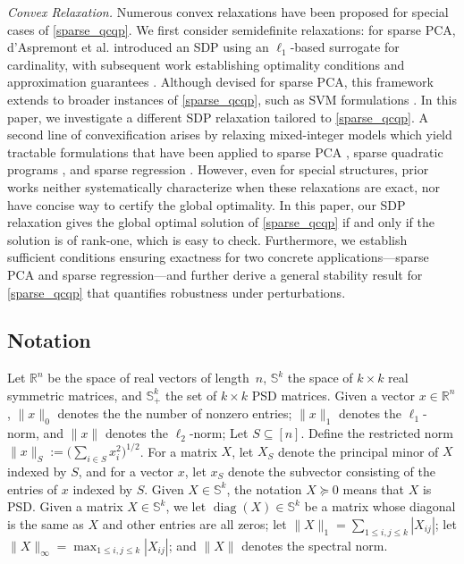 \documentclass[11pt]{amsart}
\theoremstyle{plain}
\theoremstyle{definition}
\theoremstyle{remark}
\newcommand{\RR}{\mathbb{R}}
\DeclareMathOperator{\diag}{diag}
\begin{document}
	\textit{Convex Relaxation.}
	Numerous convex relaxations have been proposed for special cases of \eqref{sparse_qcqp}. We first consider semidefinite relaxations: for sparse PCA, d’Aspremont et al. \cite{d2004direct} introduced an SDP using an $\ell_1$-based surrogate for cardinality, with subsequent work establishing optimality conditions and approximation guarantees \cite{d2008optimal,d2014approximation}. Although devised for sparse PCA, this framework extends to broader instances of \eqref{sparse_qcqp}, such as SVM formulations \cite{chan2007direct}. In this paper, we investigate a different SDP relaxation tailored to \eqref{sparse_qcqp}. A second line of convexification arises by relaxing mixed-integer models which yield tractable formulations that have been applied to sparse PCA \cite{dey2022using,li2025exact,bertsimas2022solving}, sparse quadratic programs \cite{zheng2014improving}, and sparse regression \cite{bertsimas2020sparse,bertsimas2021sparse,atamturk2025rank}. However, even for special structures, prior works neither systematically characterize when these relaxations are exact, nor have concise way to certify the global optimality. In this paper, our SDP relaxation gives the global optimal solution of \eqref{sparse_qcqp} if and only if the solution is of rank-one, which is easy to check. Furthermore, we establish sufficient conditions ensuring exactness for two concrete applications—sparse PCA and sparse regression—and further derive a general stability result for \eqref{sparse_qcqp} that quantifies robustness under perturbations.
	
	\subsection*{Notation}
	Let $\RR^n$ be the space of real vectors of length~$n$, $\mathbb{S}^k$ the space of $k \times k$ real symmetric matrices, and $\mathbb{S}^k_+$ the set of $k \times k$ PSD matrices.  Given a vector $x\in\RR^n$, $\|x\|_0$ denotes the the number of nonzero entries; $\|x\|_1$ denotes the $\ell_1$-norm, and $\|x\|$ denotes the $\ell_2$-norm; Let \(S \subseteq [n]\). Define the restricted norm \(\|x\|_{S} := \big(\sum_{i \in S} x_i^{2}\big)^{1/2}\). For a matrix \(X\), let \(X_{S}\) denote the principal minor of \(X\) indexed by \(S\), and for a vector \(x\), let \(x_{S}\) denote the subvector consisting of the entries of \(x\) indexed by \(S\). Given $X \in \mathbb{S}^k$, the notation $X \succeq 0$ means that $X$ is PSD. Given a matrix $X \in \mathbb{S}^k$, we let $\diag(X) \in \mathbb{S}^k$ be a matrix whose diagonal is the same as $X$ and other entries are all zeros; let $\|X\|_1 = \sum_{1\leq i,j\leq k} |X_{ij}|$; let $\|X\|_\infty = \max_{1\leq i,j\leq k} |X_{ij}|$; and $\|X\|$ denotes the spectral norm.
	
\end{document}
